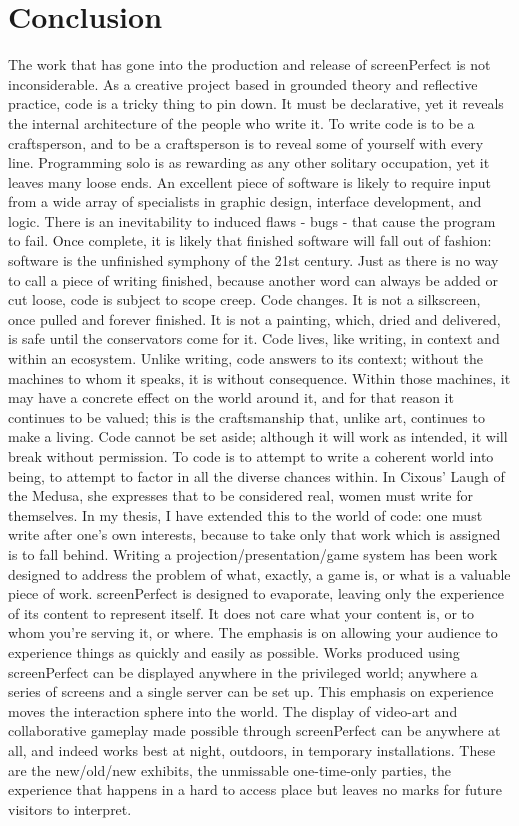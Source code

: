 \section{Conclusion}
The work that has gone into the production and release of screenPerfect is not inconsiderable. As a creative project based in grounded theory and reflective practice, code is a tricky thing to pin down. It must be declarative, yet it reveals the internal architecture of the people who write it. To write code is to be a craftsperson, and to be a craftsperson is to reveal some of yourself with every line.
Programming solo is as rewarding as any other solitary occupation, yet it leaves many loose ends. An excellent piece of software is likely to require input from a wide array of specialists in graphic design, interface development, and logic. There is an inevitability to induced flaws - bugs - that cause the program to fail. Once complete, it is likely that finished software will fall out of fashion: software is the unfinished symphony of the 21st century. Just as there is no way to call a piece of writing finished, because another word can always be added or cut loose, code is subject to scope creep. Code changes. It is not a silkscreen, once pulled and forever finished. It is not a painting, which, dried and delivered, is safe until the conservators come for it. Code lives, like writing, in context and within an ecosystem.
Unlike writing, code answers to its context; without the machines to whom it speaks, it is without consequence. Within those machines, it may have a concrete effect on the world around it, and for that reason it continues to be valued; this is the craftsmanship that, unlike art, continues to make a living. Code cannot be set aside; although it will work as intended, it will break without permission. To code is to attempt to write a coherent world into being, to attempt to factor in all the diverse chances within.
In Cixous’ Laugh of the Medusa\cite{cixous}, she expresses that to be considered real, women must write for themselves. In my thesis, I have extended this to the world of code: one must write after one’s own interests, because to take only that work which is assigned is to fall behind. Writing a projection/presentation/game system has been work designed to address the problem of what, exactly, a game is, or what is a valuable piece of work. screenPerfect is designed to evaporate, leaving only the experience of its content to represent itself. It does not care what your content is, or to whom you’re serving it, or where. The emphasis is on allowing your audience to experience things as quickly and easily as possible.
Works produced using screenPerfect can be displayed anywhere in the privileged world; anywhere a series of screens and a single server can be set up. This emphasis on experience moves the interaction sphere into the world. The display of video-art and collaborative gameplay made possible through screenPerfect can be anywhere at all, and indeed works best at night, outdoors, in temporary installations. These are the new/old/new exhibits, the unmissable one-time-only parties, the experience that happens in a hard to access place but leaves no marks for future visitors to interpret.

